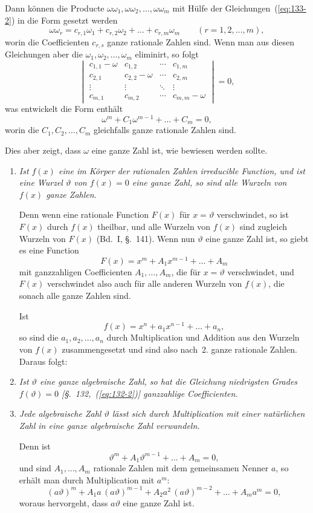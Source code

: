 \documentclass[12pt,a4paper]{article}
\theoremstyle{definition}
\begin{document}
\newpage
Dann können die Producte $\omega\omega_1,\omega\omega_2,\dots,\omega\omega_m$ mit Hülfe der Gleichungen~(\ref{eq:133-2}) in die Form gesetzt werden
\[
\omega\omega_r = c_{r,1}\omega_1 + c_{r,2}\omega_2 + \dots + c_{r,m}\omega_m
\qquad (r=1,2,\dots,m),
\]
worin die Coefficienten $c_{r,s}$ ganze rationale Zahlen sind. Wenn man aus diesen Gleichungen aber die $\omega_1,\omega_2,\dots,\omega_m$ eliminirt, so folgt
\[
\begin{vmatrix}
c_{1,1}-\omega & c_{1,2} & \cdots & c_{1,m}\\
c_{2,1} & c_{2,2}-\omega & \cdots & c_{2,m}\\
\vdots & \vdots & \ddots & \vdots\\
c_{m,1} & c_{m,2} & \cdots & c_{m,m}-\omega
\end{vmatrix}
= 0,
\]
was entwickelt die Form enthält
\[
\omega^m + C_1\omega^{m-1} + \dots + C_m = 0,
\]
worin die $C_1,C_2,\dots,C_m$ gleichfalls ganze rationale Zahlen sind.

Dies aber zeigt, dass $\omega$ eine ganze Zahl ist, wie bewiesen werden sollte.

\begin{enumerate}[label=\arabic*., resume]
\item \textit{Ist $f(x)$ eine im Körper der rationalen Zahlen irreducible Function, und ist eine Wurzel $\vartheta$ von $f(x)=0$ eine ganze Zahl, so sind alle Wurzeln von $f(x)$ ganze Zahlen.}

Denn wenn eine rationale Function $F(x)$ für $x=\vartheta$ verschwindet, so ist $F(x)$ durch $f(x)$ theilbar, und alle Wurzeln von $f(x)$ sind zugleich Wurzeln von $F(x)$ (Bd.~I, \S.~141). Wenn nun $\vartheta$ eine ganze Zahl ist, so giebt es eine Function
\[
F(x) = x^m + A_1x^{m-1} + \dots + A_m
\]
mit ganzzahligen Coefficienten $A_1,\dots,A_m$, die für $x=\vartheta$ verschwindet, und $F(x)$ verschwindet also auch für alle anderen Wurzeln von $f(x)$, die sonach alle ganze Zahlen sind.

Ist
\[
f(x) = x^n + a_1x^{n-1} + \dots + a_n,
\]
so sind die $a_1,a_2,\dots,a_n$ durch Multiplication und Addition aus den Wurzeln von $f(x)$ zusammengesetzt und sind also nach~2. ganze rationale Zahlen. Daraus folgt:

\item \textit{Ist $\vartheta$ eine ganze algebraische Zahl, so hat die Gleichung niedrigsten Grades $f(\vartheta)=0$ [\S.~132,~(\ref{eq:132-2})] ganzzahlige Coefficienten.}

\item \textit{Jede algebraische Zahl $\vartheta$ lässt sich durch Multiplication mit einer natürlichen Zahl in eine ganze algebraische Zahl verwandeln.}

Denn ist
\[
\vartheta^m + A_1\vartheta^{m-1} + \dots + A_m = 0,
\]
und sind $A_1,\dots,A_m$ rationale Zahlen mit dem gemeinsamen Nenner $a$, so erhält man durch Multiplication mit $a^m$:
\[
(a\vartheta)^m + A_1a\,(a\vartheta)^{m-1} + A_2a^2\,(a\vartheta)^{m-2} + \dots + A_ma^m = 0,
\]
woraus hervorgeht, dass $a\vartheta$ eine ganze Zahl ist.
\end{enumerate}
\end{document}
